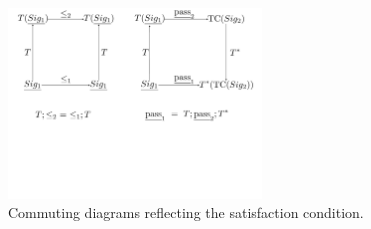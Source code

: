 \begin{figure}
\centering
\includegraphics[width=0.6\textwidth]{satisfaction-condition.pdf}
\vspace*{-20mm}
 \caption{Commuting diagrams reflecting the satisfaction condition.}
 \label{fig:satisfaction-relation}
 \end{figure}


